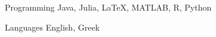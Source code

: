 

\begin{cvskills}

  \cvskill
    {Programming} %
    {Java, Julia, \LaTeX, MATLAB, R, Python} %

  \cvskill
    {Languages} %
    {English, Greek} %

\end{cvskills}